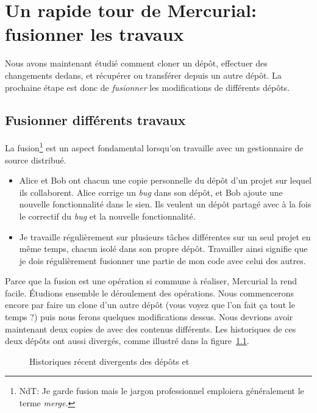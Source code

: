 \chapter{Un rapide tour de Mercurial: fusionner les travaux}
\label{chap:tour-merge}

Nous avons maintenant étudié comment cloner un dépôt, effectuer
des changements dedans, et récupérer ou transférer depuis un 
autre dépôt. La prochaine étape est donc de \emph{fusionner} les
modifications de différents dépôts.

\section{Fusionner différents travaux} %
La fusion\footnote{NdT: Je garde fusion mais le jargon professionnel 
emploiera généralement le terme \textit{merge}.} est un aspect 
fondamental lorsqu'on travaille avec un gestionnaire de source 
distribué.
\begin{itemize}
\item Alice et Bob ont chacun une copie personnelle du dépôt d'un
  projet sur lequel ils collaborent. Alice corrige un \textit{bug} 
  dans son dépôt, et Bob ajoute une nouvelle fonctionnalité dans le
  sien. Ils veulent un dépôt partagé avec à la fois le correctif du
  \textit{bug} et la nouvelle fonctionnalité.
\item Je travaille régulièrement sur plusieurs tâches différentes sur
  un seul projet en même temps, chacun isolé dans son propre dépôt.
  Travailler ainsi signifie que je dois régulièrement fusionner une 
  partie de mon code avec celui des autres.
\end{itemize}

Parce que la fusion est une opération si commune à réaliser,
Mercurial la rend facile. Étudions ensemble le déroulement des opérations.
Nous commencerons encore par faire un clone d'un autre dépôt (vous voyez
que l'on fait ça tout le temps ?) puis nous ferons quelques modifications
dessus.
Nous devrions avoir maintenant deux copies de  avec 
des contenus différents. Les historiques de ces deux dépôts ont aussi 
divergés, comme illustré dans la figure~\ref{fig:tour-merge:sep-repos}.


\begin{figure}[ht]
  \centering
  \caption{Historiques récent divergents des dépôts  
  et }
  \label{fig:tour-merge:sep-repos}
\end{figure}

